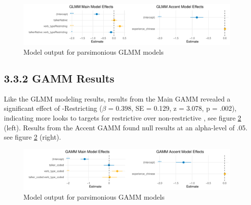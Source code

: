 \begin{figure}[H]
    \centering
    \includegraphics[width=\textwidth]{figures/GLMM_cow_model.pdf}
    \caption{Model output for parsimonious GLMM models}
    \label{fig:GLMM_cow_model}
\end{figure}

\subsection{3.3.2 GAMM Results}

Like the GLMM modeling results, results from the Main GAMM revealed a significant effect of  -Restricting  ($\beta$ = 0.398, SE = 0.129, z = 3.078, p = .002), indicating more looks to targets for restrictive  over non-restrictive , see figure \ref{fig:GAMM_cow_model} (left). Results from the Accent GAMM found null results at an alpha-level of .05. see figure \ref{fig:GAMM_cow_model} (right).

\begin{figure}[H]
    \centering
    \includegraphics[width=\textwidth]{figures/GAMM_cow_model.pdf}
    \caption{Model output for parsimonious GAMM models}
    \label{fig:GAMM_cow_model}
\end{figure}